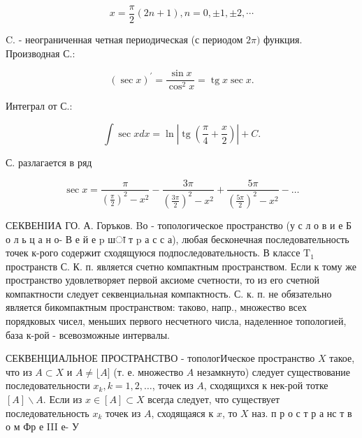 \documentclass[10pt]{article}
\begin{document}
\[

x=\frac{\pi}{2}(2 n+1), n=0, \pm 1, \pm 2, \cdots

\]



C. - неограниченная четная периодическая (с периодом $2 \pi)$ функция. Производная С.:



\[

(\sec x)^{\prime}=\frac{\sin x}{\cos ^{2} x}=\operatorname{tg} x \sec x .

\]



Интеграл от С.:



\[

\int \sec x d x=\ln \left|\operatorname{tg}\left(\frac{\pi}{4}+\frac{x}{2}\right)\right|+C .

\]



С. разлагается в ряд



\[

\sec x=\frac{\pi}{\left(\frac{\pi}{2}\right)^{2}-x^{2}}-\frac{3 \pi}{\left(\frac{3 \pi}{2}\right)^{2}-x^{2}}+\frac{5 \pi}{\left(\frac{5 \pi}{2}\right)^{2}-x^{2}}-\ldots

\]



СЕКВЕНIИА ГО. А. Горъков. Bо - топологическое пространство (у с л о в и е Б о л ь ц а н о- В е й е $\mathrm{p}$ шा т $\mathrm{p}$ а с с а), любая бесконечная последовательность точек к-рого содержит сходящуюся подпоследовательность. В классе $\mathrm{T}_{1}$ пространств С. К. п. является счетно компактным пространством. Если к тому же пространство удовлетворяет первой аксиоме счетности, то из его счетной компактности следует секвенциальная компактность. С. к. п. не обязательно является бикомпактным пространством: таково, напр., множество всех порядковых чисел, меньших первого несчетного числа, наделенное топологией, база к-рой - всевозможные интервалы.



СЕКВЕНЦИАЛЬНОЕ ПРОСТРАНСТВО - топологИческое пространство $X$ такое, что из $A \subset X$ и $A \neq\lfloor A]$ (т. е. множество $A$ незамкнуто) следует существование последовательности $x_{k}, k=1,2, \ldots$, точек из $A$, сходящихся к нек-рой тотке $[A] \backslash A$. Если из $x \in[A] \subset X$ всегда следует, что существует последовательность $x_{k}$ точек из $A$, сходящаяся к $x$, то $X$ наз. п р о с т р а нс т в о м Фр е III е- У
\end{document}
